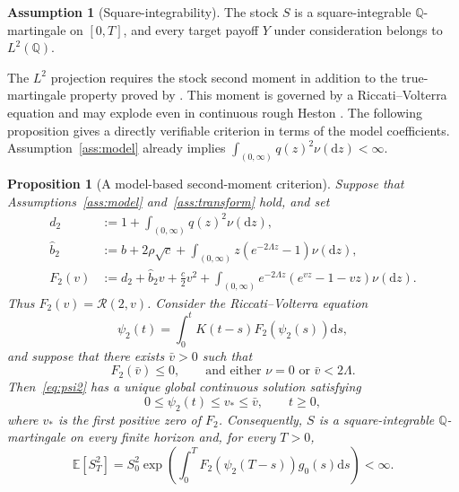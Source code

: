 \documentclass[11pt]{article}
\newtheorem{proposition}[theorem]{Proposition}
\theoremstyle{definition}
\newtheorem{assumption}[theorem]{Assumption}
\theoremstyle{remark}
\newcommand{\E}{\mathbb{E}}
\newcommand{\Q}{\mathbb{Q}}
\newcommand{\Rr}{\mathcal{R}}
\newcommand{\1}{\mathbf{1}}
\newcommand{\dd}{\mathrm{d}}
\begin{document}
\begin{assumption}[Square-integrability]
\label{ass:l2}
The stock $S$ is a square-integrable $\Q$-martingale on $[0,T]$,
and every target payoff $Y$ under consideration belongs to $L^2(\Q)$.
\end{assumption}

The $L^2$ projection requires the stock second moment in addition to the
true-martingale property proved by
\citet[Corollary~3.4]{bondi2024}. This moment is governed by a
Riccati--Volterra equation and may explode even in continuous rough Heston
\citep{gerhold2019moment}. The following proposition gives a directly
verifiable criterion in terms of the model coefficients.
Assumption~\ref{ass:model} already implies
$\int_{(0,\infty)}q(z)^2\nu(\dd z)<\infty$.

\begin{proposition}[A model-based second-moment criterion]
\label{prop:l2-sufficient}
Suppose that Assumptions~\ref{ass:model} and~\ref{ass:transform} hold, and set
\begin{align}
 d_2&:=1+\int_{(0,\infty)}q(z)^2\nu(\dd z),
 \nonumber\\
 \widehat b_2&:=b+2\rho\sqrt c
   +\int_{(0,\infty)}z\left(e^{-2\Lambda z}-1\right)\nu(\dd z),
 \label{eq:d2-b2}\\
 F_2(v)&:=d_2+\widehat b_2v+\frac c2v^2
   +\int_{(0,\infty)}e^{-2\Lambda z}
      \left(e^{vz}-1-vz\right)\nu(\dd z).
 \label{eq:F2}
\end{align}
Thus $F_2(v)=\Rr(2,v)$. Consider the Riccati--Volterra equation
\begin{equation}
 \psi_2(t)=\int_0^t K(t-s)F_2\left(\psi_2(s)\right)\dd s,
 \label{eq:psi2}
\end{equation}
and suppose that there exists $\bar v>0$ such that
\begin{equation}
 F_2(\bar v)\le0,
 \qquad
 \text{and either }\nu=0\text{ or }\bar v<2\Lambda.
 \label{eq:F2-barrier}
\end{equation}
Then~\eqref{eq:psi2} has a unique global continuous solution satisfying
\begin{equation}
 0\le\psi_2(t)\le v_*\le\bar v,
 \qquad t\ge0,
 \label{eq:psi2-bounds}
\end{equation}
where $v_*$ is the first positive zero of $F_2$. Consequently, $S$ is a
square-integrable $\Q$-martingale on every finite horizon and, for every
$T>0$,
\begin{equation}
 \E[S_T^2]
 =S_0^2\exp\left(
   \int_0^T F_2\left(\psi_2(T-s)\right)g_0(s)\dd s
 \right)<\infty.
 \label{eq:stock-second-moment}
\end{equation}
\end{proposition}
\end{document}
